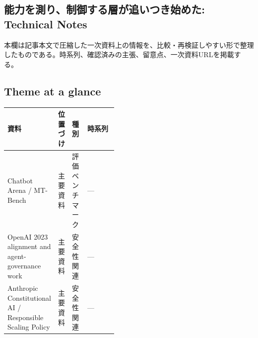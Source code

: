 \subsection*{能力を測り、制御する層が追いつき始めた: Technical Notes}
本欄は記事本文で圧縮した一次資料上の情報を、比較・再検証しやすい形で整理したものである。時系列、確認済みの主張、留意点、一次資料URLを掲載する。
\smallskip
{}\par
\medskip
\subsection*{Theme at a glance}
\begin{center}
\footnotesize
\begin{tabularx}{\linewidth}{@{}p{0.20\linewidth}p{0.10\linewidth}p{0.14\linewidth}X@{}}
\toprule
資料 & 位置づけ & 種別 & 時系列 \\
\midrule
Chatbot Arena / MT-Bench & 主要資料 & 評価ベンチマーク & — \\
OpenAI 2023 alignment and agent-governance work & 主要資料 & 安全性関連 & — \\
Anthropic Constitutional AI / Responsible Scaling Policy & 主要資料 & 安全性関連 & — \\
\bottomrule
\end{tabularx}
\end{center}
\normalsize

